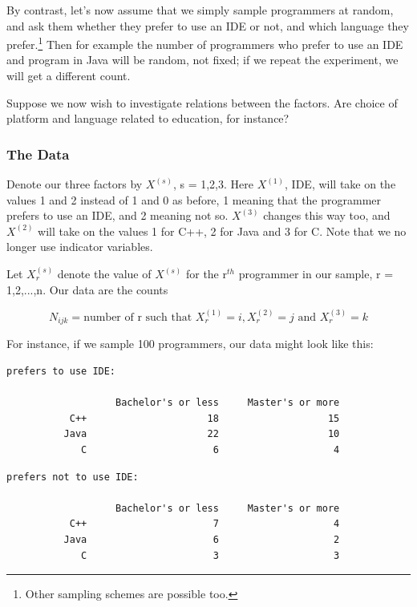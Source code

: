 By contrast, let's now assume that we simply sample programmers at
random, and ask them whether they prefer to use an IDE or not, and which
language they prefer.\footnote{Other sampling schemes are possible too.}
Then for example the number of programmers who prefer to use an IDE and
program in Java will be random, not fixed; if we repeat the experiment,
we will get a different count.

Suppose we now wish to investigate relations between the factors.
Are choice of platform and language related to education, for instance?

\subsubsection{The Data}

Denote our three factors by $X^{(s)}$, s = 1,2,3.  Here $X^{(1)}$, IDE,
will take on the values 1 and 2 instead of 1 and 0 as before, 1 meaning
that the programmer prefers to use an IDE, and 2 meaning not so.
$X^{(3)}$ changes this way too, and $X^{(2)}$ will take on the values 1
for C++, 2 for Java and 3 for C.  Note that we no longer use indicator
variables.

Let $X_r^{(s)}$ denote the value of $X^{(s)}$ for the r$^{th}$
programmer in our sample, r = 1,2,...,n.  Our data are the counts

\begin{equation}
N_{ijk} = \textrm{number of r such that } X_r^{(1)} = i, X_r^{(2)} = j
\textrm{ and } X_r^{(3)} = k
\end{equation}

For instance, if we sample 100 programmers, our data might look like
this:

\begin{Verbatim}[fontsize=\relsize{-2}]
prefers to use IDE:

                   Bachelor's or less     Master's or more
           C++                     18                   15
          Java                     22                   10
             C                      6                    4
\end{Verbatim}

\begin{Verbatim}[fontsize=\relsize{-2}]
prefers not to use IDE:

                   Bachelor's or less     Master's or more
           C++                      7                    4
          Java                      6                    2
             C                      3                    3
\end{Verbatim}

